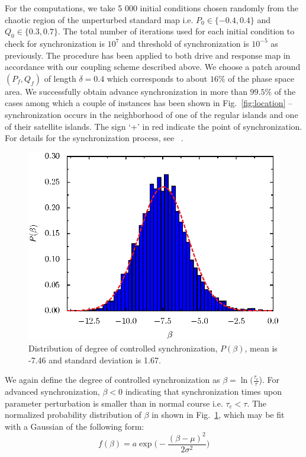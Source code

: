 \documentclass[reprint,superscriptaddress,amsmath,amssymb,aps,pre]{revtex4-1}
\begin{document}
For the computations, we take 5 000 initial conditions chosen randomly from 
the chaotic region of the unperturbed standard map i.e. $P_0 \in \{-0.4,0.4\}$ 
and $Q_0 \in \{0.3,0.7\}$. The total number of iterations used for each 
initial condition to check for synchronization is $10^7$ and threshold of 
synchronization is $10^{-5}$ as previously.  The procedure has 
been applied to both drive and 
response map in accordance with our coupling  scheme described above. We 
choose a patch around $(P_f,Q_f)$  of length $\delta= 0.4$ which corresponds 
to about $16\%$ of the phase space area. We successfully obtain advance 
synchronization in more than $99.5\%$ of the cases among which a  couple of 
instances  has been shown in Fig.~\ref{fig:location} -- synchronization occurs 
in the neighborhood of one of the regular islands and one of their satellite 
islands.  The sign `+' in red indicate the point of synchronization. For 
details for the synchronization process, see ~\cite{Mahata2016,Das2017}.
\begin{figure}[h]
    \includegraphics[scale=0.8]{sync_time_beta.eps}
    \caption{\label{fig:beta_dist}\footnotesize Distribution of degree of 
        controlled synchronization, $P(\beta)$, mean is -7.46 and standard 
        deviation is 1.67.}
\end{figure}
We again define the degree of controlled synchronization as $\beta = \ln 
(\frac{\tau_c}{\tau}$). For advanced synchronization, $\beta < 0$ indicating 
that synchronization times upon parameter perturbation is smaller than in 
normal course i.e. $\tau_c < \tau$. The normalized probability distribution of 
$\beta$ in shown in Fig.~\ref{fig:beta_dist}, which may be fit with a Gaussian 
of the following form:
\begin{equation}
f(\beta) =  a\exp\Big(-\frac{(\beta-\mu)^2}{2\sigma^2}\Big)
\end{equation}
\end{document}
